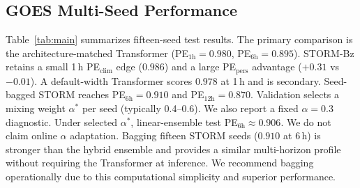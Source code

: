 \documentclass[conference]{IEEEtran}
\begin{document}
\subsection{GOES Multi-Seed Performance}
Table~\ref{tab:main} summarizes fifteen-seed test results.
The primary comparison is the architecture-matched Transformer
(PE$_{1\mathrm{h}}=0.980$, PE$_{6\mathrm{h}}=0.895$).
STORM-Bz retains a small 1\,h PE$_{\mathrm{clim}}$ edge ($0.986$)
and a large PE$_{\mathrm{pers}}$ advantage ($+0.31$ vs $-0.01$).
A default-width Transformer scores $0.978$ at 1\,h and is secondary.
Seed-bagged STORM reaches PE$_{6\mathrm{h}}=0.910$ and PE$_{12\mathrm{h}}=0.870$.
Validation selects a mixing weight \(\alpha^*\) per seed (typically 0.4--0.6). We also report a fixed \(\alpha=0.3\) diagnostic. Under selected \(\alpha^*\), linear-ensemble test PE\(_{6\mathrm{h}} \approx 0.906\). We do not claim online \(\alpha\) adaptation.
Bagging fifteen STORM seeds (\(0.910\) at 6\,h) is stronger than the hybrid ensemble and provides a similar multi-horizon profile without requiring the Transformer at inference. We recommend bagging operationally due to this computational simplicity and superior performance.
\end{document}
